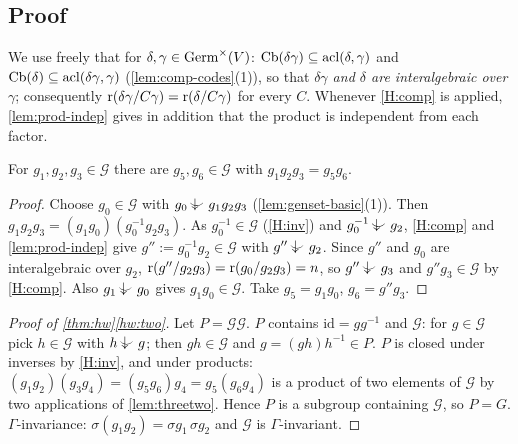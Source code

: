 \subsection{Proof}

We use freely that for $\delta,\gamma\in\operatorname{Germ}^\times(V)$: $\operatorname{Cb}(\delta\gamma)\subseteq
\operatorname{acl}(\delta,\gamma)$ and $\operatorname{Cb}(\delta)\subseteq\operatorname{acl}(\delta\gamma,\gamma)$ (\cref{lem:comp-codes}(1)),
so that \emph{$\delta\gamma$ and $\delta$ are interalgebraic over $\gamma$}; consequently
$\operatorname{r}(\delta\gamma/C\gamma)=\operatorname{r}(\delta/C\gamma)$ for every $C$.  Whenever \ref{H:comp} is
applied, \cref{lem:prod-indep} gives in addition that the product is independent from
each factor.

\begin{lemma}\label{lem:threetwo}
For $g_1,g_2,g_3\in\mathcal G$ there are $g_5,g_6\in\mathcal G$ with $g_1g_2g_3=g_5g_6$.
\end{lemma}
\begin{proof}
Choose $g_0\in\mathcal G$ with $g_0\ind{}g_1g_2g_3$ (\cref{lem:genset-basic}(1)).  Then
$g_1g_2g_3=(g_1g_0)(g_0^{-1}g_2g_3)$.  As $g_0^{-1}\in\mathcal G$ (\ref{H:inv}) and
$g_0^{-1}\ind{}g_2$, \ref{H:comp} and \cref{lem:prod-indep} give $g'':=g_0^{-1}g_2\in\mathcal G$
with $g''\ind{}g_2$.
Since $g''$ and $g_0$ are interalgebraic over $g_2$,
$\operatorname{r}(g''/g_2g_3)=\operatorname{r}(g_0/g_2g_3)=n$, so $g''\ind{}g_3$ and $g''g_3\in\mathcal G$ by
\ref{H:comp}.  Also $g_1\ind{}g_0$ gives $g_1g_0\in\mathcal G$.  Take $g_5=g_1g_0$,
$g_6=g''g_3$.
\end{proof}

\begin{proof}[Proof of \cref{thm:hw}\ref{hw:two}]
Let $P=\mathcal G\mathcal G$.  $P$ contains $\mathrm{id}=gg^{-1}$ and $\mathcal G$: for
$g\in\mathcal G$ pick $h\in\mathcal G$ with $h\ind{}g$; then $gh\in\mathcal G$ and
$g=(gh)h^{-1}\in P$.  $P$ is closed under inverses by \ref{H:inv}, and under products:
$(g_1g_2)(g_3g_4)=(g_5g_6)g_4=g_5(g_6g_4)$ is a product of two elements of $\mathcal G$ by
two applications of \cref{lem:threetwo}.  Hence $P$ is a subgroup containing
$\mathcal G$, so $P=G$.  $\Gamma$-invariance: $\sigma(g_1g_2)=\sigma g_1\,\sigma g_2$ and
$\mathcal G$ is $\Gamma$-invariant.
\end{proof}

